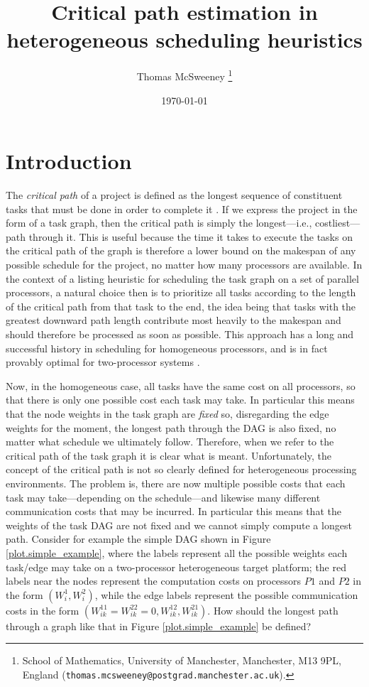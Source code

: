 \documentclass[12pt]{article}
\title{Critical path estimation in heterogeneous scheduling heuristics} %
\author{Thomas McSweeney%
	\thanks{%
		School of Mathematics,
		University of Manchester,
		Manchester, M13 9PL, England
		(\texttt{thomas.mcsweeney@postgrad.manchester.ac.uk}).
	}
}
\date{\today}
\begin{document}
	\maketitle 	


\section{Introduction}
\label{sect.intro}

The {\em critical path} of a project is defined as the longest sequence of constituent tasks that must be done in order to complete it \cite{kel59,kel61}. If we express the project in the form of a task graph, then the critical path is simply the longest---i.e., costliest---path through it. This is useful because the time it takes to execute the tasks on the critical path of the graph is therefore a lower bound on the makespan of any possible schedule for the project, no matter how many processors are available. In the context of a listing heuristic for scheduling the task graph on a set of parallel processors, a natural choice then is to prioritize all tasks according to the length of the critical path from that task to the end, the idea being that tasks with the greatest downward path length contribute most heavily to the makespan and should therefore be processed as soon as possible. This approach has a long and successful history in scheduling for homogeneous processors, and is in fact provably optimal for two-processor systems \cite{cof72}. 

Now, in the homogeneous case, all tasks have the same cost on all processors, so that there is only one possible cost each task may take. In particular this means that the node weights in the task graph are {\em fixed} so, disregarding the edge weights for the moment, the longest path through the DAG is also fixed, no matter what schedule we ultimately follow. Therefore, when we refer to the critical path of the task graph it is clear what is meant. Unfortunately, the concept of the critical path is not so clearly defined for heterogeneous processing environments. The problem is, there are now multiple possible costs that each task may take---depending on the schedule---and likewise many different communication costs that may be incurred. In particular this means that the weights of the task DAG are not fixed and we cannot  simply compute a longest path. Consider for example the simple DAG shown in Figure \ref{plot.simple_example}, where the labels represent all the possible weights each task/edge may take on a two-processor heterogeneous target platform; the red labels near the nodes represent the computation costs on processors $P1$ and $P2$ in the form $(W_i^1, W_i^2)$, while the edge labels represent the possible communication costs in the form $(W_{ik}^{11} = W_{ik}^{22} = 0, W_{ik}^{12}, W_{ik}^{21})$. How should the longest path through a graph like that in Figure \ref{plot.simple_example} be defined?
\end{document}
